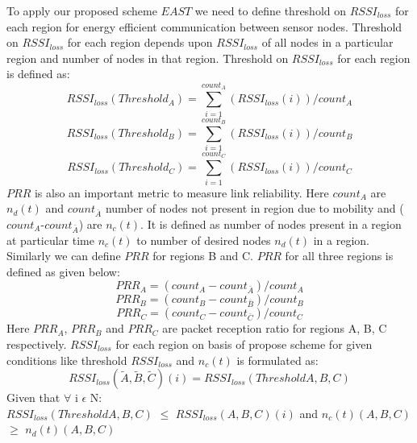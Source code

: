 \documentclass[12pt, conference, compsocconf, onecolumn, draftcls]{IEEEtran}
\begin{document}
To apply our proposed scheme $EAST$ we need to define threshold on $RSSI_{loss}$ for each region for energy efficient communication between sensor nodes. Threshold on $RSSI_{loss}$ for each region depends upon $RSSI_{loss}$ of all nodes in a particular region and number of nodes in that region. Threshold on $RSSI_{loss}$ for each region is defined as:\\
\begin{equation}
RSSI_{loss}(Threshold_{A})=\sum_{i=1}^{count_{A}} (RSSI_{loss}(i))/count_{A}
\end{equation}
\begin{equation}
RSSI_{loss}(Threshold_{B})=\sum_{i=1}^{count_{B}} (RSSI_{loss}(i))/count_{B}
\end{equation}
\begin{equation}
RSSI_{loss}(Threshold_{C})=\sum_{i=1}^{count_{C}} (RSSI_{loss}(i))/count_{C}
\end{equation}
$PRR$ is also an important metric to measure link reliability. Here $count_{A}$ are $n_{d}(t)$ and $count_{\bar {A}}$ number of nodes not present in region due to mobility and ($count_{A}$-$count_{\bar {A}}$) are $n_{c}(t)$. It is defined as number of nodes present in a region at particular time $n_{c}(t)$ to number of desired nodes $n_{d}(t)$ in  a region.  Similarly we can define $PRR$ for regions B and C. $PRR$ for all three regions is defined as given below:\\
\begin{equation}
PRR_{A}=(count_{A}-count_{\bar {A}})/count_{A}
\end{equation}
\begin{equation}
PRR_{B}=(count_{B}-count_{\bar {B}})/count_{B}
\end{equation}
\begin{equation}
PRR_{C}=(count_{C}-count_{\bar {C}})/count_{C}
\end{equation}
Here $PRR_{A}$, $PRR_{B}$ and $PRR_{C}$  are packet reception ratio for regions A, B, C respectively. $RSSI_{loss}$ for each region on basis of propose scheme for given conditions like threshold $RSSI_{loss}$ and $n_{c}(t)$ is formulated as:  \\
\begin{equation}
RSSI_{loss}(\tilde {A}, \tilde {B}, \tilde {C})(i)=RSSI_{loss} (Threshold A, B, C)
\end{equation}
Given that $\forall$ i $\epsilon$ N:\\
$RSSI_{loss}(Threshold A, B, C)$ $\leq$ $RSSI_{loss}(A, B, C)(i)$ and $n_{c}(t)(A, B, C)$ $\geq$ $n_{d}(t)(A, B, C)$\\
\end{document}
